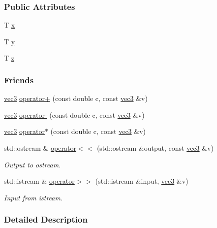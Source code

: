 \subsubsection*{Public Attributes}
\begin{DoxyCompactItemize}
\item 
T \mbox{\hyperlink{structvec3_a3f1f0c60e13b8bf67f64b1afc9cd6d1a}{x}}
\item 
T \mbox{\hyperlink{structvec3_a77c2f238c0b2b7895304f5ca64b8d770}{y}}
\item 
T \mbox{\hyperlink{structvec3_a7879033e3409225479ae0079c92d9afd}{z}}
\end{DoxyCompactItemize}
\subsubsection*{Friends}
\begin{DoxyCompactItemize}
\item 
\mbox{\hyperlink{structvec3}{vec3}} \mbox{\hyperlink{structvec3_a5a4f97c459eb49bb2e18ed9f0e486114}{operator+}} (const double c, const \mbox{\hyperlink{structvec3}{vec3}} \&v)
\item 
\mbox{\hyperlink{structvec3}{vec3}} \mbox{\hyperlink{structvec3_a3daa3a334acdaef0cebfb9cb8b7c2992}{operator-\/}} (const double c, const \mbox{\hyperlink{structvec3}{vec3}} \&v)
\item 
\mbox{\hyperlink{structvec3}{vec3}} \mbox{\hyperlink{structvec3_a8e5a34109d722a0e43d027e496eebc98}{operator$\ast$}} (const double c, const \mbox{\hyperlink{structvec3}{vec3}} \&v)
\item 
std\+::ostream \& \mbox{\hyperlink{structvec3_af5e1bcad9d3d484d6f4e6b3f8949f5cf}{operator$<$$<$}} (std\+::ostream \&output, const \mbox{\hyperlink{structvec3}{vec3}} \&v)
\begin{DoxyCompactList}\small\item\em Output to ostream. \end{DoxyCompactList}\item 
std\+::istream \& \mbox{\hyperlink{structvec3_a72f92578884bd68e0747871acd8545fd}{operator$>$$>$}} (std\+::istream \&input, \mbox{\hyperlink{structvec3}{vec3}} \&v)
\begin{DoxyCompactList}\small\item\em Input from istream. \end{DoxyCompactList}\end{DoxyCompactItemize}


\subsubsection{Detailed Description}
